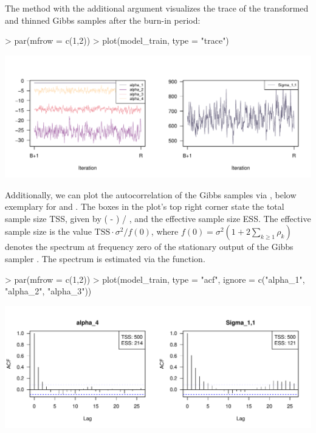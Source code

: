 \documentclass[article,shortnames]{jss}
\newcommand{\fct}[1]{\code{#1()}}
\begin{document}
The \fct{plot} method with the additional argument  visualizes the trace of the transformed and thinned Gibbs samples after the burn-in period:

\begin{Schunk}
\begin{Sinput}
> par(mfrow = c(1,2))
> plot(model_train, type = "trace")
\end{Sinput}
\end{Schunk}
\includegraphics{rprobitb_oelschlaeger_bauer-model-train-trace}

Additionally, we can plot the autocorrelation of the Gibbs samples via , below exemplary for  and . The boxes in the plot's top right corner state the total sample size TSS, given by ( - ) / , and the effective sample size ESS. The effective sample size is the value $\text{TSS} \cdot \sigma^2 / f(0)$, where $f(0) = \sigma^2(1 + 2\sum_{k\geq 1} \rho_k)$ denotes the spectrum at frequency zero of the stationary output of the Gibbs sampler \citep{Marin:2014}. The spectrum is estimated via the \fct{stats::spec.ar} function.

\begin{Schunk}
\begin{Sinput}
> par(mfrow = c(1,2))
> plot(model_train, type = "acf", ignore = c("alpha_1", "alpha_2", "alpha_3"))
\end{Sinput}
\end{Schunk}
\includegraphics{rprobitb_oelschlaeger_bauer-model-train-acf}
\end{document}
